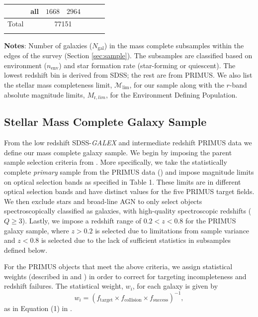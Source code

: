 \documentclass{emulateapj}
\begin{document}
\begin{table}
\begin{center}
\begin{tabular}{ccccccc}
               & all              & $1668$                      & $2964$                          \\ \hline
Total &      & \multicolumn{2}{c}{77151} & \\ \hline
  \multicolumn{4}{l}{}                                             \\       
    \end{tabular} \par
    \end{center}
    {\bf Notes}: Number of galaxies ($N_{\mathrm{gal}}$) in the mass complete subsamples within the edges of the survey (Section \ref{sec:sample}). The subsamples are classified based on environment ($n_{\mathrm{env}}$) and star formation rate (star-forming or quiescent). The lowest redshift bin is derived from SDSS; the rest are from PRIMUS. We also list the stellar mass completeness limit, $\mathcal{M}_{\mathrm{lim}}$, for our sample along with the $r$-band absolute magnitude limits, $M_{\mathrm{r}, lim}$, for the Environment Defining Population. 
    \bigskip
\end{table}

\subsection{Stellar Mass Complete Galaxy Sample} \label{sec:target} 
From the low redshift SDSS-{\em GALEX} and intermediate redshift
PRIMUS data we define our mass complete galaxy
sample. We begin by imposing the parent sample selection criteria from
\cite{Moustakas:2013aa}. More specifically, we take the statistically
complete {\em primary} sample from the PRIMUS data
(\citealt{Coil:2011aa}) and impose magnitude limits on optical
selection bands as specified in \cite{Moustakas:2013aa} Table 1. These
limits are in different optical selection bands and have distinct
values for the five PRIMUS target fields. We then exclude stars and
broad-line AGN to only select objects spectroscopically classified as
galaxies, with high-quality spectroscopic redshifts ($Q \geq
3$). Lastly, we impose a redshift range of $ 0.2 < z < 0.8$ for the
PRIMUS galaxy sample, where $ z > 0.2$ is selected due to limitations
from sample variance and $ z < 0.8$ is selected due to the lack of
sufficient statistics in subsamples defined below.

For the PRIMUS objects that meet the above criteria, we assign statistical weights (described in \citealt{Coil:2011aa} and \citealt{Cool:2013aa}) in order to correct for targeting incompleteness and redshift failures. The statistical weight, $w_i$, for each galaxy is given by
\begin{equation}
w_{i} = (f_{\mathrm{target}} \times f_{\mathrm{collision}} \times f_{\mathrm{success}})^{-1},
\end{equation}
as in Equation (1) in \cite{Moustakas:2013aa}. 
\end{document}
